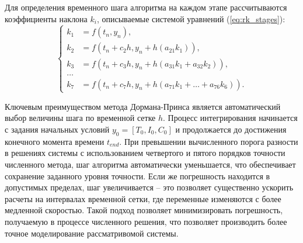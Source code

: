 Для определения временного шага алгоритма на каждом этапе рассчитываются
коэффициенты наклона $k_i$, описываемые системой уравнений (\ref{eq:rk_stages}):
\begin{equation}
\label{eq:rk_stages}
\begin{cases}
  k_1 &= f(t_n, y_n), \\
  k_2 &= f(t_n + c_2 h, y_n + h(a_{21} k_1)), \\
  k_3 &= f(t_n + c_3 h, y_n + h(a_{31} k_1 + a_{32} k_2)), \\
  \dots \\
  k_7 &= f(t_n + c_7 h, y_n + h(a_{71} k_1 + \dots + a_{76} k_6)).
\end{cases}
\end{equation}

Ключевым преимуществом метода Дормана-Принса является автоматический выбор
величины шага по временной сетке $h$. Процесс интегрирования начинается с
задания начальных условий $y_0 = [T_0, I_0, C_0]$ и продолжается до достижения
конечного момента времени $t_{end}$. При превышении вычисленного порога
разности в решениях системы с использованием четвертого
и пятого порядков точности численного метода, шаг алгоритма автоматически
уменьшается, что обеспечивает сохранение заданного уровня точности. Если же
погрешность находится в допустимых пределах, шаг увеличивается -- это позволяет
существенно ускорить расчеты на интервалах временной сетки, где переменные
изменяются с более медленной скоростью. Такой подход позволяет минимизировать
погрешность, получаемую в процессе численного решения, что позволяет
производить более точное моделирование рассматривомой системы.

